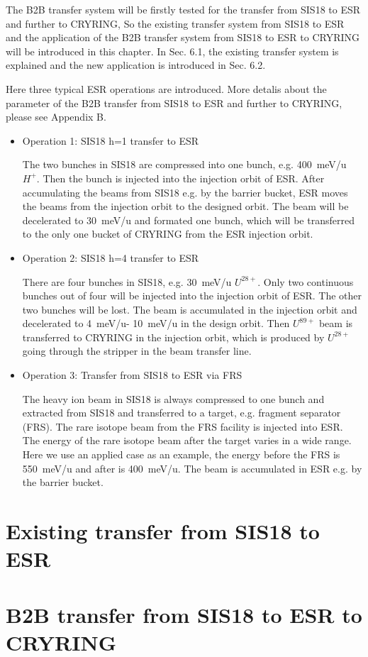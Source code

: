 The B2B transfer system will be firstly tested for the transfer from SIS18 to ESR and further to CRYRING, So the existing transfer system from SIS18 to ESR and the application of the B2B transfer system from SIS18 to ESR to CRYRING will be introduced in this chapter. In Sec. 6.1, the existing transfer system is explained and the new application is introduced in Sec. 6.2.

Here three typical ESR operations are introduced. More detalis about the parameter of the B2B transfer from SIS18 to ESR and further to CRYRING, please see Appendix B.
\begin{itemize}
\item Operation 1: SIS18 h=1 transfer to ESR

The two bunches in SIS18 are compressed into one bunch, e.g. \SI{400}{\meV/\atomicmassunit} $H^{+}$. Then the bunch is injected into the injection orbit of ESR. After accumulating the beams from SIS18 e.g. by the barrier bucket, ESR moves the beams from the injection orbit to the designed orbit. The beam will be decelerated to \SI{30}{\meV/\atomicmassunit} and formated one bunch, which will be transferred to the only one bucket of CRYRING from the ESR injection orbit.

\item Operation 2: SIS18 h=4 transfer to ESR

There are four bunches in SIS18, e.g. \SI{30}{\meV/\atomicmassunit} $U^{28+}$. Only two continuous bunches out of four will be injected into the injection orbit of ESR. The other two bunches will be lost. The beam is accumulated in the injection orbit and decelerated to \SI{4}{\meV/\atomicmassunit}- \SI{10}{\meV/\atomicmassunit} in the design orbit. Then $U^{89+}$ beam is transferred to CRYRING in the injection orbit, which is produced by $U^{28+}$ going through the stripper in the beam transfer line.
\item Operation 3: Transfer from SIS18 to ESR via FRS

The heavy ion beam in SIS18 is always compressed to one bunch and extracted from SIS18 and transferred to a target, e.g. fragment separator (FRS). The rare isotope beam from the FRS facility is injected into ESR. The energy of the rare isotope beam after the target varies in a wide range. Here we use an applied case as an example, the energy before the FRS is \SI{550}{\meV/\atomicmassunit} and after is \SI{400}{\meV/\atomicmassunit}. The beam is accumulated in ESR e.g. by the barrier bucket.

\end{itemize}

\section{Existing transfer from SIS18 to ESR}

\section{B2B transfer from SIS18 to ESR to CRYRING}



